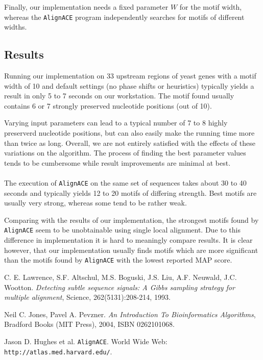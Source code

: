 \documentclass[a4paper,11pt]{article}
\begin{document}
Finally, our implementation needs a fixed parameter $W$ for the motif width,
whereas the \texttt{AlignACE} program independently searches for motifs of
different widths.


\subsection*{Results}

Running our implementation on 33 upstream  regions of yeast genes with a motif
width of 10 and default settings (no phase shifts or heuristics) typically
yields a result in only 5 to 7 seconds on our workstation. The motif found
usually contains 6 or 7 strongly preserved nucleotide positions (out of 10).

Varying input parameters can lead to a typical number of 7 to 8 highly
preserverd nucleotide positions, but can also easily make the running time
more than twice as long. Overall, we are not entirely satisfied with the
effects of these variations on the algorithm. The process of finding the best
parameter values tends to be cumbersome while result improvements are minimal
at best.

\paragraph{}

The execution of \texttt{AlignACE} on the same set of sequences takes about
30 to 40 seconds and typically yields 12 to 20 motifs of differing strength.
Best motifs are usually very strong, whereas some tend to be rather weak.

Comparing with the results of our implementation, the strongest motifs found
by \texttt{AlignACE} seem to be unobtainable using single local alignment. Due
to this difference in implementation it is hard to meaningly compare results.
It is clear however, that our implementation usually finds motifs which are
more significant than the motifs found by \texttt{AlignACE} with the lowest
reported MAP score.


\begin{thebibliography}{99}

C. E. Lawrence, S.F. Altschul, M.S. Boguski, J.S. Liu,
A.F. Neuwald, J.C. Wootton. \emph{Detecting subtle sequence signals: A Gibbs
sampling strategy for multiple alignment}, Science, 262(5131):208-214, 1993.

Neil C. Jones, Pavel A. Pevzner. \emph{An Introduction To
Bioinformatics Algorithms}, Bradford Books (MIT Press), 2004, ISBN 0262101068.

Jason D. Hughes et al. \texttt{AlignACE}.
World Wide Web: \texttt{http://atlas.med.harvard.edu/}.

\end{thebibliography}
\end{document}
